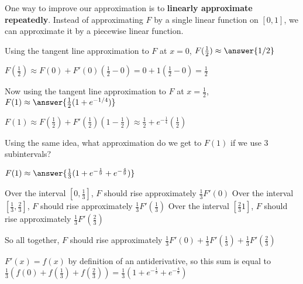 \documentclass{ximera}
\begin{document}
	\begin{question}
		One way to improve our approximation is to \textbf{linearly approximate repeatedly}.  Instead of approximating $F$ by a single linear function on $[0,1]$, we can approximate it by a piecewise linear function. 
		
		Using the tangent line approximation to $F$ at $x=0$, $F(\frac{1}{2}) \approx \answer{1/2}$
			\begin{hint}
				$F(\frac{1}{2}) \approx F(0)+F'(0)(\frac{1}{2} - 0) = 0+1(\frac{1}{2}-0) = \frac{1}{2}$
			\end{hint}
		
		Now using the tangent line approximation to $F$ at $x=\frac{1}{2}$, $F(1) \approx \answer{\frac{1}{2}(1+e^{-1/4})}$
			\begin{hint}
				$F(1) \approx F(\frac{1}{2}) + F'(\frac{1}{2})(1 - \frac{1}{2}) \approx \frac{1}{2} + e^{-\frac{1}{4}}(\frac{1}{2})$
			\end{hint}
	\end{question}
	
	\begin{question}
		Using the same idea, what approximation do we get to $F(1)$ if we use $3$ subintervals?
		
		$F(1) \approx \answer{\frac{1}{3}(1+e^{-\frac{1}{9}}+e^{-\frac{4}{9}})}$
			\begin{hint}
				\begin{itemize}
				\itemize Over the interval $[0,\frac{1}{3}]$, $F$ should rise approximately $\frac{1}{3} F'(0) $
				\itemize  Over the interval $[\frac{1}{3},\frac{2}{3}]$, $F$ should rise approximately $\frac{1}{3} F'(\frac{1}{3}) $
				\itemize  Over the interval $[\frac{2}{3}1]$, $F$ should rise approximately $\frac{1}{3} F'(\frac{2}{3}) $
				\end{itemize}
				
				So all together, $F$ should rise approximately $\frac{1}{3} F'(0) + \frac{1}{3}F'(\frac{1}{3})+\frac{1}{3} F'(\frac{2}{3})$
			\end{hint}
			\begin{hint}
				$F'(x) = f(x)$ by definition of an antiderivative, so this sum is equal to $\frac{1}{3} (f(0)+f(\frac{1}{3})+f(\frac{2}{3})) = \frac{1}{3}(1+e^{-\frac{1}{9}}+e^{-\frac{4}{9}})$
			\end{hint}
	\end{question}
	
\end{document}
